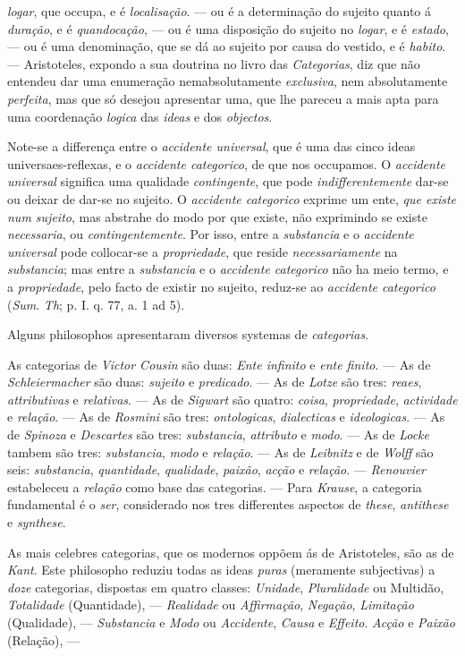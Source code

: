 \emph{logar}, que occupa, e é \emph{localisação}. --- ou é a determinação do sujeito quanto á \emph{duração}, e é \emph{quandocação}, --- ou é uma disposição do sujeito no \emph{logar}, e é \emph{estado}, --- ou é uma denominação, que se dá ao sujeito por causa do vestido, e é \emph{habito}. --- Aristoteles, expondo a sua doutrina no livro das \emph{Categorias}, diz que não entendeu dar uma enumeração nemabsolutamente \emph{exclusiva}, nem absolutamente \emph{perfeita}, mas que só desejou apresentar uma, que lhe pareceu a mais apta para uma coordenação \emph{logica} das \emph{ideas} e dos \emph{objectos}.\par Note-se a differença entre o \emph{accidente universal}, que é uma das cinco ideas universaes-reflexas, e o \emph{accidente categorico}, de que nos occupamos. O \emph{accidente universal} significa uma qualidade \emph{contingente}, que pode \emph{indifferentemente} dar-se ou deixar de dar-se no sujeito. O \emph{accidente categorico} exprime um ente, \emph{que existe num sujeito}, mas abstrahe do modo por que existe, não exprimindo se existe \emph{necessaria}, ou \emph{contingentemente}. Por isso, entre a \emph{substancia} e o \emph{accidente universal} pode collocar-se a \emph{propriedade}, que reside \emph{necessariamente} na \emph{substancia}; mas entre a \emph{substancia} e o \emph{accidente categorico} não ha meio termo, e a \emph{propriedade}, pelo facto de existir no sujeito, reduz-se ao \emph{accidente categorico} (\emph{Sum}. \emph{Th}; p. I. q. 77, a. 1 ad 5).\par Alguns philosophos apresentaram diversos systemas de \emph{categorias}.\par As categorias de \emph{Victor Cousin} são duas: \emph{Ente infinito} e \emph{ente finito}. --- As de \emph{Schleiermacher} são duas: \emph{sujeito} e \emph{predicado}. --- As de \emph{Lotze} são tres: \emph{reaes}, \emph{attributivas} e \emph{relativas}. --- As de \emph{Sigwart} são quatro: \emph{coisa}, \emph{propriedade}, \emph{actividade} e \emph{relação}. --- As de \emph{Rosmini} são tres: \emph{ontologicas}, \emph{dialecticas} e \emph{ideologicas}. --- As de \emph{Spinoza} e \emph{Descartes} são tres: \emph{substancia}, \emph{attributo} e \emph{modo}. --- As de \emph{Locke} tambem são tres: \emph{substancia}, \emph{modo} e \emph{relação}. --- As de \emph{Leibnitz} e de \emph{Wolff} são seis: \emph{substancia}, \emph{quantidade}, \emph{qualidade}, \emph{paixão}, \emph{acção} e \emph{relação}. --- \emph{Renouvier} estabeleceu a \emph{relação} como base das categorias. --- Para \emph{Krause}, a categoria fundamental é o \emph{ser}, considerado nos tres differentes aspectos de \emph{these}, \emph{antithese} e \emph{synthese}.\par As mais celebres categorias, que os modernos oppõem ás de Aristoteles, são as de \emph{Kant}. Este philosopho reduziu todas as ideas \emph{puras} (meramente subjectivas) a \emph{doze} categorias, dispostas em quatro classes: \emph{Unidade}, \emph{Pluralidade} ou Multidão, \emph{Totalidade} (Quantidade), --- \emph{Realidade} ou \emph{Affirmação}, \emph{Negação}, \emph{Limitação} (Qualidade), --- \emph{Substancia} e \emph{Modo} ou \emph{Accidente}, \emph{Causa} e \emph{Effeito}. \emph{Acção} e \emph{Paixão} (Relação), --- 
